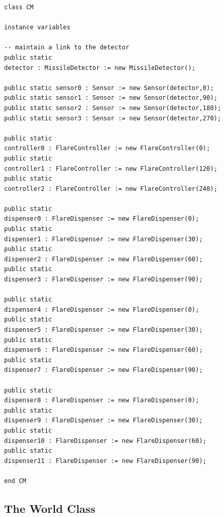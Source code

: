 \documentclass{overturerepchap}
\begin{document}
\begin{lstlisting}
class CM

instance variables

-- maintain a link to the detector
public static 
detector : MissileDetector := new MissileDetector();

public static sensor0 : Sensor := new Sensor(detector,0);
public static sensor1 : Sensor := new Sensor(detector,90);
public static sensor2 : Sensor := new Sensor(detector,180);
public static sensor3 : Sensor := new Sensor(detector,270);

public static 
controller0 : FlareController := new FlareController(0);
public static 
controller1 : FlareController := new FlareController(120);
public static 
controller2 : FlareController := new FlareController(240);

public static 
dispenser0 : FlareDispenser := new FlareDispenser(0);
public static 
dispenser1 : FlareDispenser := new FlareDispenser(30);
public static 
dispenser2 : FlareDispenser := new FlareDispenser(60);
public static 
dispenser3 : FlareDispenser := new FlareDispenser(90);

public static 
dispenser4 : FlareDispenser := new FlareDispenser(0);
public static 
dispenser5 : FlareDispenser := new FlareDispenser(30);
public static 
dispenser6 : FlareDispenser := new FlareDispenser(60);
public static 
dispenser7 : FlareDispenser := new FlareDispenser(90);

public static 
dispenser8 : FlareDispenser := new FlareDispenser(0);
public static 
dispenser9 : FlareDispenser := new FlareDispenser(30);
public static 
dispenser10 : FlareDispenser := new FlareDispenser(60);
public static 
dispenser11 : FlareDispenser := new FlareDispenser(90);

end CM
\end{lstlisting}

\subsection{The World Class}
\end{document}
